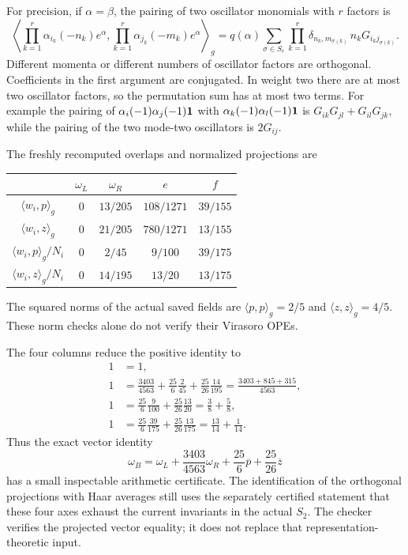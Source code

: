 \documentclass[11pt]{article}
\theoremstyle{remark}\newtheorem{remark}[proposition]{Remark}
\begin{document}
For precision, if $\alpha=\beta$, the pairing of two oscillator
monomials with $r$ factors is
\[
\left\langle\prod_{k=1}^r\alpha_{i_k}(-n_k)e^\alpha,
\prod_{k=1}^r\alpha_{j_k}(-m_k)e^\alpha\right\rangle_g
=q(\alpha)\sum_{\sigma\in S_r}
\prod_{k=1}^r\delta_{n_k,m_{\sigma(k)}}\,n_kG_{i_kj_{\sigma(k)}}.
\]
Different momenta or different numbers of oscillator factors are
orthogonal. Coefficients in the first argument are conjugated. In
weight two there are at most two oscillator factors, so the permutation
sum has at most two terms. For example the pairing of
$\alpha_i(-1)\alpha_j(-1)\mathbf1$ with
$\alpha_k(-1)\alpha_l(-1)\mathbf1$ is
$G_{ik}G_{jl}+G_{il}G_{jk}$, while the pairing of the two mode-two
oscillators is $2G_{ij}$.

The freshly recomputed overlaps and normalized projections are
\begin{center}
\begin{tabular}{@{}ccccc@{}}\toprule
 & $\omega_L$ & $\omega_R$ & $e$ & $f$\\\midrule
$\langle w_i,p\rangle_g$ & $0$ & $13/205$ & $108/1271$ & $39/155$\\
$\langle w_i,z\rangle_g$ & $0$ & $21/205$ & $780/1271$ & $13/155$\\\midrule
$\langle w_i,p\rangle_g/N_i$ & $0$ & $2/45$ & $9/100$ & $39/175$\\
$\langle w_i,z\rangle_g/N_i$ & $0$ & $14/195$ & $13/20$ & $13/175$\\\bottomrule
\end{tabular}\end{center}
The squared norms of the actual saved fields are
$\langle p,p\rangle_g=2/5$ and $\langle z,z\rangle_g=4/5$.
These norm checks alone do not verify their Virasoro OPEs.

The four columns reduce the positive identity to
\[
\begin{split}
1&=1,\\
1&=\frac{3403}{4563}+\frac{25}{6}\frac{2}{45}
                         +\frac{25}{26}\frac{14}{195}
   =\frac{3403+845+315}{4563},\\
1&=\frac{25}{6}\frac9{100}+\frac{25}{26}\frac{13}{20}
   =\frac38+\frac58,\\
1&=\frac{25}{6}\frac{39}{175}+\frac{25}{26}\frac{13}{175}
   =\frac{13}{14}+\frac1{14}.
\end{split}
\]
Thus the exact vector identity
\[
\omega_B=\omega_L+\frac{3403}{4563}\omega_R
                      +\frac{25}{6}\overline p+\frac{25}{26}\overline z
\]
has a small inspectable arithmetic certificate. The identification of
the orthogonal projections with Haar averages still uses the separately
certified statement that these four axes exhaust the current invariants
in the actual $S_2$. The checker verifies the projected vector equality;
it does not replace that representation-theoretic input.
\end{document}
